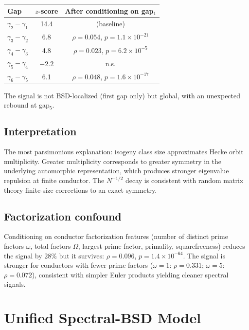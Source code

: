 \documentclass[11pt,a4paper]{article}
\begin{document}
\begin{center}
\begin{tabular}{lcc}
\toprule
\textbf{Gap} & \textbf{$z$-score} & \textbf{After conditioning on gap$_1$} \\
\midrule
$\gamma_2 - \gamma_1$ & 14.4 & (baseline) \\
$\gamma_3 - \gamma_2$ & 6.8 & $\rho = 0.054$, $p = 1.1 \times 10^{-21}$ \\
$\gamma_4 - \gamma_3$ & 4.8 & $\rho = 0.023$, $p = 6.2 \times 10^{-5}$ \\
$\gamma_5 - \gamma_4$ & $-2.2$ & n.s. \\
$\gamma_6 - \gamma_5$ & 6.1 & $\rho = 0.048$, $p = 1.6 \times 10^{-17}$ \\
\bottomrule
\end{tabular}
\end{center}

The signal is not BSD-localized (first gap only) but global, with an unexpected rebound at gap$_5$.

\subsection{Interpretation}

The most parsimonious explanation: isogeny class size approximates Hecke orbit multiplicity. Greater multiplicity corresponds to greater symmetry in the underlying automorphic representation, which produces stronger eigenvalue repulsion at finite conductor. The $N^{-1/2}$ decay is consistent with random matrix theory finite-size corrections to an exact symmetry.

\subsection{Factorization confound}

Conditioning on conductor factorization features (number of distinct prime factors $\omega$, total factors $\Omega$, largest prime factor, primality, squarefreeness) reduces the signal by 28\% but it survives: $\rho = 0.096$, $p = 1.4 \times 10^{-64}$. The signal is stronger for conductors with fewer prime factors ($\omega = 1$: $\rho = 0.331$; $\omega = 5$: $\rho = 0.072$), consistent with simpler Euler products yielding cleaner spectral signals.

\section{Unified Spectral-BSD Model}
\label{sec:unified}
\end{document}
